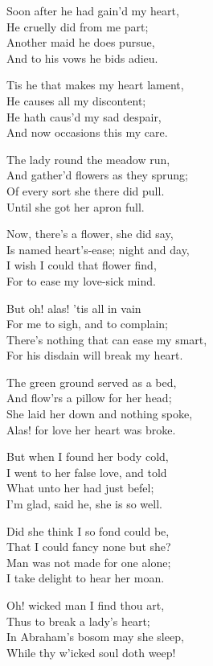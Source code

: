 \begin{dcverse}\footnotesizerr
Soon after he had gain’d my heart,\\
He cruelly did from me part;\\
Another maid he does pursue,\\
And to his vows he bids adieu.

Tis he that makes my heart lament,\\
He causes all my discontent;\\
He hath caus’d my sad despair,\\
And now occasions this my care.

The lady round the meadow run,\\
And gather’d flowers as they sprung;\\
Of every sort she there did pull.\\
Until she got her apron full.

Now, there’s a flower, she did say,\\
Is named heart’s-ease; night and day,\\
I wish I could that flower find,\\
For to ease my love-sick mind.

But oh! alas! ’tis all in vain\\
For me to sigh, and to complain;\\
There’s nothing that can ease my smart,\\
For his disdain will break my heart.

The green ground served as a bed,\\
And flow’rs a pillow for her head;\\
She laid her down and nothing spoke,\\
Alas! for love her heart was broke.

But when I found her body cold,\\
I went to her false love, and told\\
What unto her had just befel;\\
I’m glad, said he, she is so well.

Did she think I so fond could be,\\
That I could fancy none but she?\\
Man was not made for one alone;\\
I take delight to hear her moan.

Oh! wicked man I find thou art,\\
Thus to break a lady's heart;\\
In Abraham’s bosom may she sleep,\\
While thy w'icked soul doth weep!


\end{dcverse}
